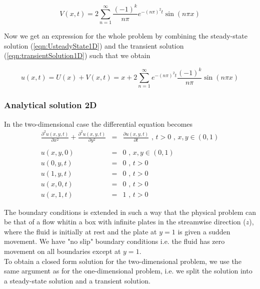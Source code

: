 \documentclass{article}
\begin{document}
\begin{equation}
V(x,t) = 2\sum_{n=1}^{\infty} \frac{(-1)^k}{n\pi} e^{-(n\pi)^2 t}\sin(n\pi x)
\label{eqn:transientSolution1D}
\end{equation}

Now we get an expression for the whole problem by combining the steady-state solution (\ref{eqn:UsteadyState1D}) and the transient solution (\ref{eqn:transientSolution1D}) such that we obtain 

\begin{equation}
u(x,t) = U(x) + V(x,t) = x + 2\sum_{n=1}^{\infty}e^{-(n\pi)^2 t} \frac{(-1)^k}{n\pi}
\sin(n\pi x)
\label{eqn:solution1D}
\end{equation}

\subsubsection{Analytical solution 2D}
In the two-dimensional case the differential equation becomes
\begin{subequations}
	\begin{eqnarray}
	\frac{\partial^2 u(x,y,t)}{\partial x^2} + \frac{\partial^2 u(x,y,t)}{\partial y^2} &=&  \frac{\partial u(x,y,t)}{\partial t} \textit{ , } t>0 \textit{ , } x,y \in (0,1) \\ \nonumber \\
	u(x,y,0) &=& 0 \textit{ , } x,y \in (0,1) \\ 
	u(0,y,t) &=& 0 \textit{ , } t> 0 \\
	u(1,y,t) &=& 0 \textit{ , } t> 0 \\
	u(x,0,t) &=& 0 \textit{ , } t> 0  \\
	u(x,1,t) &=& 1 \textit{ , } t> 0 
	\end{eqnarray}
\end{subequations}

The boundary conditions is extended in such a way that the physical problem can be that of a flow whitin a box with infinite plates in the streamwise direction ($z$), where the fluid is initially at rest and the plate at $y=1$ is given a sudden movement. We have "no slip" boundary conditions i.e. the fluid has zero movement on all boundaries except at $y=1$.\\

To obtain a closed form solution for the two-dimensional problem, we use the same argument as for the one-dimensional problem, i.e. we split the solution into a steady-state solution and a transient solution.\\
\end{document}
